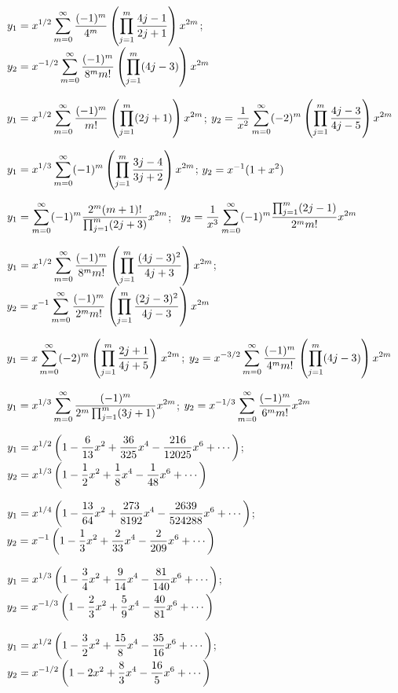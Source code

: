 $y_{1}=\displaystyle{x^{1/2}\sum_{m=0}^{\infty}\frac{(-1)^{m}}{4^{m}}\left(\prod_{j=1}^{m}
\frac{4j-1}{2j+1}\right)x^{2m}}$;
$y_{2}=\displaystyle{x^{-1/2}\sum_{m=0}^{\infty}\frac{(-1)^{m}}{8^{m}m!}\left(\prod_{j=1}^{m}
(4j-3)\right)x^{2m}}$

$y_{1}=\displaystyle{x^{1/2}\sum_{m=0}^{\infty}\frac{(-1)^{m}}{m!}\left(\prod_{j=1}^{m}(2j+1)\right)x^{2m}}$;
$y_{2}=\displaystyle{\frac{1}{x^{2}}\sum_{m=0}^{\infty}(-2)^{m}\left(\prod_{j=1}^{m}\frac{4j-3}{4j-5}\right)x^{2m}}$

$y_{1}=\displaystyle{x^{1/3}\sum_{m=0}^{\infty}(-1)^{m}\left(\prod_{j=1}^{m}
\frac{3j-4}{3j+2}\right)
x^{2m}}$;    $y_{2}=\displaystyle{x^{-1}(1+x^{2})}$

$y_{1}=\displaystyle{\sum_{m=0}^{\infty}(-1)^{m}\frac{2^{m}(m+1)!}{\prod_{j=1}^{m}(2j+3)}x^{2m}}$; \,
$y_{2}=\displaystyle{\frac{1}{x^{3}}\sum_{m=0}^{\infty}(-1)^{m}\frac{\prod_{j=1}^{m}(2j-1)}{2^{m}m!}x^{2m}}$

$y_{1}=\displaystyle{x^{1/2}\sum_{m=0}^{\infty}\frac{(-1)^{m}}{8^{m}m!}\left(\prod_{j=1}^{m}
\frac{(4j-3)^{2}}{4j+3}\right)x^{2m}}$;
$y_{2}=\displaystyle{x^{-1}\sum_{m=0}^{\infty}\frac{(-1)^{m}}{2^{m}m!}\left(\prod_{j=1}^{m}
\frac{(2j-3)^{2}}{4j-3}\right)
x^{2m}}$

$y_{1}=\displaystyle{x\sum_{m=0}^{\infty}(-2)^{m}\left(\prod_{j=1}^{m}\frac{2j+1}{4j+5}\right)x^{2m}}$;
$y_{2}=\displaystyle{x^{-3/2}\sum_{m=0}^{\infty}\frac{(-1)^{m}}{4^{m}m!}\left(\prod_{j=1}^{m}(4j-3)
\right)x^{2m}}$

$y_{1}=\displaystyle{x^{1/3}\sum_{m=0}^{\infty}\frac{(-1)^{m}}{2^{m}\prod_{j=1}^{m}(3j+1)}
x^{2m}}$;
$y_{2}=\displaystyle{x^{-1/3}\sum_{m=0}^{\infty}\frac{(-1)^{m}}{6^{m}m!}x^{2m}}$

$y_{1}=\displaystyle{x^{1/2}\left(1-\frac{6}{13}x^{2}+\frac{36}{325}x^{4}-
\frac{216}{12025}x^{6}
+\cdots\right)}$;    \,
$y_{2}=\displaystyle{x^{1/3}\left(1-\frac{1}{2}x^{2}+\frac{1}{8}x^{4}-\frac{1}{48}x^{6}
+\cdots\right)}$

$y_{1}=\displaystyle{x^{1/4}\left(1-\frac{13}{64}x^{2}+\frac{273}{8192}x^{4}-
\frac{2639}{524288}x^{6}+\cdots\right)}$; \,
$y_{2}=\displaystyle{x^{-1}\left(1-\frac{1}{3}x^{2}+\frac{2}{33}x^{4}-\frac{2}{209}x^{6}
+\cdots\right)}$

$y_{1}=\displaystyle{x^{1/3}\left(1-\frac{3}{4}x^{2}+\frac{9}{14}x^{4}-\frac{81}{140}x^{6}
+\cdots\right)}$; \,
$y_{2}=\displaystyle{x^{-1/3}\left(1-\frac{2}{3}x^{2}+\frac{5}{9}x^{4}-
\frac{40}{81}x^{6}+\cdots\right)}$

$y_{1}=\displaystyle{x^{1/2}\left(1-\frac{3}{2}x^{2}+\frac{15}{8}x^{4}-\frac{35}{16}x^{6}
+\cdots\right)}$; \,
$y_{2}=\displaystyle{x^{-1/2}\left(1-2x^{2}+\frac{8}{3}x^{4}-\frac{16}{5}x^{6}
+\cdots\right)}$


